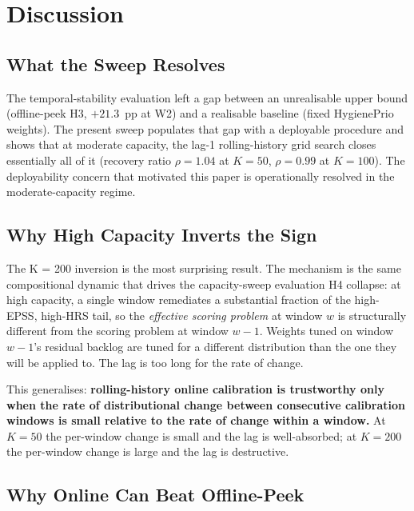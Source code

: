 \section{Discussion}

\subsection{What the Sweep Resolves}

The temporal-stability evaluation left a gap between an unrealisable upper bound (offline-peek
H3, $+21.3$~pp at W2) and a realisable baseline (fixed HygienePrio
weights). The present sweep populates that gap with a deployable
procedure and shows that at moderate capacity, the lag-1 rolling-history
grid search closes essentially all of it (recovery ratio $\rho = 1.04$
at $K = 50$, $\rho = 0.99$ at $K = 100$). The deployability concern
that motivated this paper is operationally resolved in the moderate-capacity
regime.

\subsection{Why High Capacity Inverts the Sign}

The K = 200 inversion is the most surprising result. The mechanism is
the same compositional dynamic that drives the capacity-sweep evaluation H4 collapse:
at high capacity, a single window remediates a substantial fraction
of the high-EPSS, high-HRS tail, so the
\textit{effective scoring problem} at window $w$ is structurally
different from the scoring problem at window $w - 1$. Weights tuned
on window $w - 1$'s residual backlog are tuned for a different
distribution than the one they will be applied to. The lag is too
long for the rate of change.

This generalises: \textbf{rolling-history online calibration is
trustworthy only when the rate of distributional change between
consecutive calibration windows is small relative to the rate of
change within a window.} At $K = 50$ the per-window change is
small and the lag is well-absorbed; at $K = 200$ the per-window
change is large and the lag is destructive.

\subsection{Why Online Can Beat Offline-Peek}


